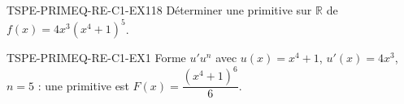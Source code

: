 

\begin{exercice}{TSPE-PRIMEQ-RE-C1-EX1}{1}{8}
Déterminer une primitive sur $\mathbb{R}$ de $f(x) = 4x^3(x^4+1)^5$.
\end{exercice}


\begin{corrige}{TSPE-PRIMEQ-RE-C1-EX1}
Forme $u'u^n$ avec $u(x)=x^4+1$, $u'(x)=4x^3$, $n=5$ : une primitive est $F(x) = \dfrac{(x^4+1)^6}{6}$.
\end{corrige}
